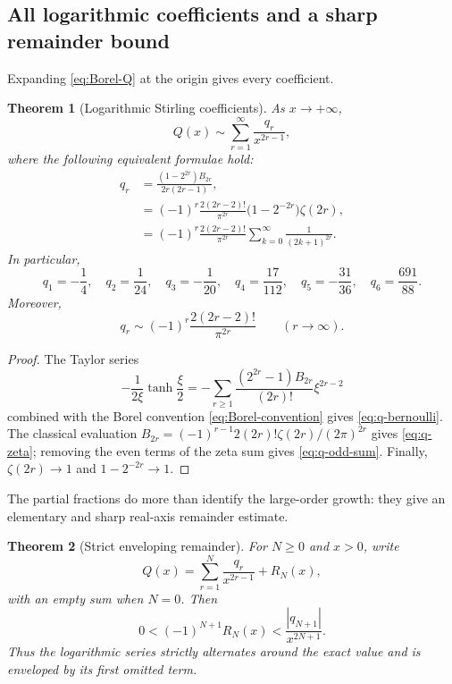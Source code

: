 \documentclass[11pt]{article}
\newtheorem{theorem}{Theorem}[section]
\theoremstyle{definition}
\theoremstyle{remark}
\begin{document}
\subsection{All logarithmic coefficients and a sharp remainder bound}

Expanding \eqref{eq:Borel-Q} at the origin gives every coefficient.

\begin{theorem}[Logarithmic Stirling coefficients]\label{thm:qcoeff}
As $x\to+\infty$,
\begin{equation}\label{eq:Qasympt}
 Q(x)\sim\sum_{r=1}^\infty\frac{q_r}{x^{2r-1}},
\end{equation}
where the following equivalent formulae hold:
\begin{align}
 q_r
 &=\frac{(1-2^{2r})B_{2r}}{2r(2r-1)},\label{eq:q-bernoulli}\\
 &=(-1)^r\frac{2(2r-2)!}{\pi^{2r}}
    \bigl(1-2^{-2r}\bigr)\zeta(2r),\label{eq:q-zeta}\\
 &=(-1)^r\frac{2(2r-2)!}{\pi^{2r}}
    \sum_{k=0}^\infty\frac{1}{(2k+1)^{2r}}.\label{eq:q-odd-sum}
\end{align}
In particular,
\begin{equation}\label{eq:q-first}
 q_1=-\frac14,\quad q_2=\frac1{24},\quad q_3=-\frac1{20},\quad
 q_4=\frac{17}{112},\quad q_5=-\frac{31}{36},\quad
 q_6=\frac{691}{88}.
\end{equation}
Moreover,
\begin{equation}\label{eq:q-largeorder}
 q_r\sim(-1)^r\frac{2(2r-2)!}{\pi^{2r}}\qquad(r\to\infty).
\end{equation}
\end{theorem}

\begin{proof}
The Taylor series
\[
 -\frac{1}{2\xi}\tanh\!\frac\xi2
 =-\sum_{r\ge1}\frac{(2^{2r}-1)B_{2r}}{(2r)!}\xi^{2r-2}
\]
combined with the Borel convention \eqref{eq:Borel-convention} gives \eqref{eq:q-bernoulli}.  The classical evaluation
$B_{2r}=(-1)^{r-1}2(2r)!\zeta(2r)/(2\pi)^{2r}$ gives \eqref{eq:q-zeta}; removing the even terms of the zeta sum gives \eqref{eq:q-odd-sum}.  Finally, $\zeta(2r)\to1$ and $1-2^{-2r}\to1$.
\end{proof}

The partial fractions do more than identify the large-order growth: they give an elementary and sharp real-axis remainder estimate.

\begin{theorem}[Strict enveloping remainder]\label{thm:Qremainder}
For $N\ge0$ and $x>0$, write
\begin{equation}\label{eq:RNdef}
 Q(x)=\sum_{r=1}^{N}\frac{q_r}{x^{2r-1}}+R_N(x),
\end{equation}
with an empty sum when $N=0$.  Then
\begin{equation}\label{eq:remainder-bound}
 0<(-1)^{N+1}R_N(x)
 <\frac{|q_{N+1}|}{x^{2N+1}}.
\end{equation}
Thus the logarithmic series strictly alternates around the exact value and is enveloped by its first omitted term.
\end{theorem}
\end{document}
